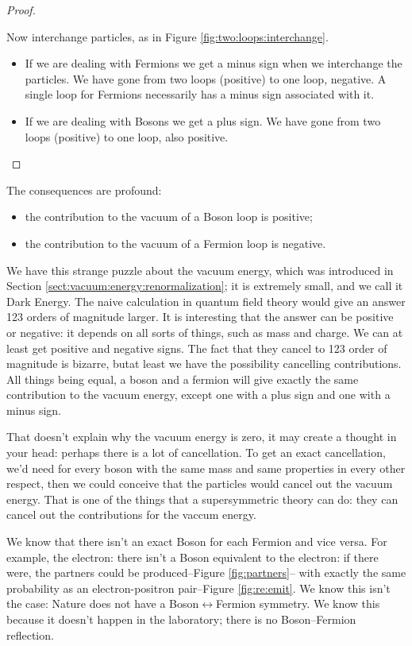 \documentclass[]{article}
\begin{document}
\begin{proof}
\begin{itemize}
	\end{itemize}
	Now interchange particles, as in Figure \ref{fig:two:loops:interchange}.
	\begin{itemize}
		\item If we are dealing with Fermions we get a minus sign when we interchange the particles. We have gone from two loops (positive) to one loop, negative. A single loop for Fermions necessarily has a minus sign associated with it.
		\item If we are dealing with Bosons we get a plus sign. We have gone from two loops (positive) to one loop, also positive.
	\end{itemize} 
\end{proof}

The consequences are profound:
\begin{itemize}
	\item the contribution to the vacuum of a Boson loop is positive;
	\item the contribution to the vacuum of a Fermion loop is negative.
\end{itemize}
We have this strange puzzle about the vacuum energy, which was introduced in Section \ref{sect:vacuum:energy:renormalization}; it is extremely small, and we call it Dark Energy. The naive calculation in quantum field theory would give an answer 123 orders of magnitude larger. It is interesting that the answer can be positive or negative: it depends on all sorts of things, such as mass and charge. We can at least get positive and negative signs. The fact that they cancel to 123 order of magnitude is bizarre, butat least we have the possibility cancelling contributions. All things being equal, a boson and a fermion will give exactly the same contribution to the vacuum energy, except one with a plus sign and one with a minus sign.

That doesn't explain why the vacuum energy is zero, it may create a thought in your head: perhaps there is a lot of cancellation. To get an exact cancellation, we'd need for every boson with the same mass and same properties in every other respect, then we could conceive that the particles would cancel out the vacuum energy. That is one of the things that a supersymmetric theory can do: they can cancel out the contributions for the vaccum energy.

We know that there isn't an exact Boson for each Fermion and vice versa. For example, the electron: there isn't a Boson equivalent to the electron: if there were, the partners could be produced--Figure \ref{fig:partners}-- with exactly the same probability as an electron-positron pair--Figure \ref{fig:re:emit}. We know this isn't the case: Nature does not have a Boson$\leftrightarrow$Fermion symmetry. We know this because it doesn't happen in the laboratory; there is no Boson--Fermion reflection.  
\end{document}
